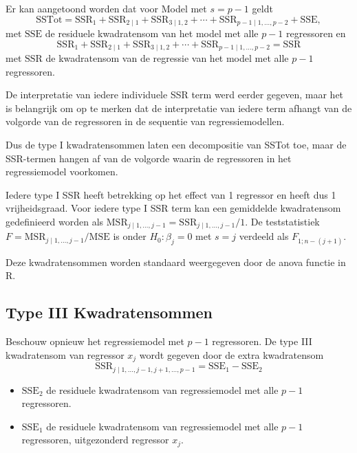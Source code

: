 \documentclass[12pt,dutch,coursenotes]{book}
\providecommand{\tightlist}{%
  \setlength{\itemsep}{0pt}\setlength{\parskip}{0pt}}
\theoremstyle{definition}
\theoremstyle{definition}
\theoremstyle{definition}
\theoremstyle{remark}
\begin{document}
Er kan aangetoond worden dat voor Model met \(s=p-1\) geldt \[
 \text{SSTot} = \text{SSR}_1 + \text{SSR}_{2\mid 1} + \text{SSR}_{3\mid 1,2} + \cdots + \text{SSR}_{p-1\mid 1,\ldots, p-2} + \text{SSE},
\] met \(\text{SSE}\) de residuele kwadratensom van het model met alle
\(p-1\) regressoren en \[
  \text{SSR}_1 + \text{SSR}_{2\mid 1} + \text{SSR}_{3\mid 1,2} + \cdots + \text{SSR}_{p-1\mid 1,\ldots, p-2} = \text{SSR}
\] met \(\text{SSR}\) de kwadratensom van de regressie van het model met
alle \(p-1\) regressoren.

De interpretatie van iedere individuele SSR term werd eerder gegeven,
maar het is belangrijk om op te merken dat de interpretatie van iedere
term afhangt van de volgorde van de regressoren in de sequentie van
regressiemodellen.

Dus de type I kwadratensommen laten een decompositie van SSTot toe, maar
de SSR-termen hangen af van de volgorde waarin de regressoren in het
regressiemodel voorkomen.

Iedere type I SSR heeft betrekking op het effect van 1 regressor en
heeft dus 1 vrijheidsgraad. Voor iedere type I SSR term kan een
gemiddelde kwadratensom gedefinieerd worden als
\(\text{MSR}_{j\mid 1,\ldots, j-1}=\text{SSR}_{j\mid 1,\ldots, j-1}/1\).
De teststatistiek \(F=\text{MSR}_{j\mid 1,\ldots, j-1}/\text{MSE}\) is
onder \(H_0:\beta_j=0\) met \(s=j\) verdeeld als \(F_{1;n-(j+1)}\).

Deze kwadratensommen worden standaard weergegeven door de anova functie
in R.

\subsection{Type III Kwadratensommen}\label{type-iii-kwadratensommen}

Beschouw opnieuw het regressiemodel met \(p-1\) regressoren. De type III
kwadratensom van regressor \(x_j\) wordt gegeven door de extra
kwadratensom \[
  \text{SSR}_{j \mid 1,\ldots, j-1,j+1,\ldots, p-1} = \text{SSE}_1-\text{SSE}_2
\]

\begin{itemize}
\tightlist
\item
  \(\text{SSE}_2\) de residuele kwadratensom van regressiemodel met alle
  \(p-1\) regressoren.
\item
  \(\text{SSE}_1\) de residuele kwadratensom van regressiemodel met alle
  \(p-1\) regressoren, uitgezonderd regressor \(x_j\).
\end{itemize}
\end{document}
